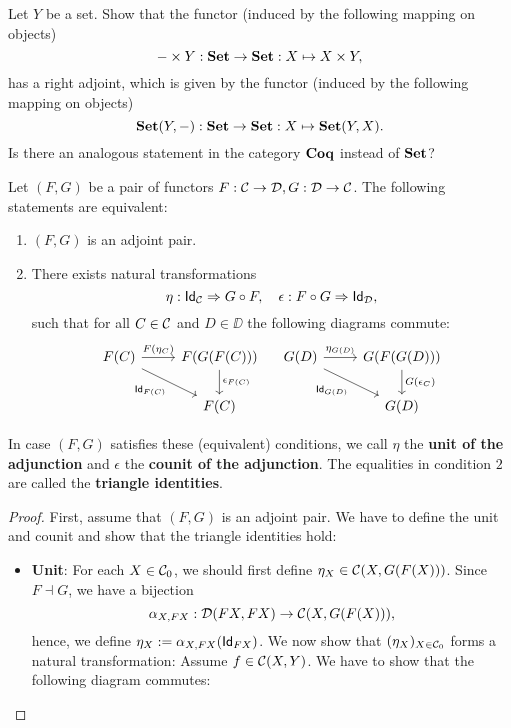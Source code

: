 \begin{exer}\label{exer:adjunction_homtensor_currying} Let $Y$ be a set. Show that the functor (induced by the following mapping on objects)
\[
- \times Y : \SET\to \SET: X\mapsto X\times Y,
\]
has a right adjoint, which is given by the functor (induced by the following mapping on objects)
\[
\CHom{\SET}{Y}{-} : \SET\to\SET : X\mapsto \CHom{\SET}{Y}{X}.
\]
Is there an analogous statement in the category $\COQ$ instead of $\SET$?
\end{exer}

\begin{thm} Let $(F,G)$ be a pair of functors $F : \CC\to\DD, G: \DD\to\CC$. The following statements are equivalent:
\begin{enumerate}
\item $(F,G)$ is an adjoint pair.
\item There exists natural transformations 
\[
\NatTrans{\eta}{\Id[\CC]}{\co{F}{G}}, \quad \NatTrans{\epsilon}{\co{G}{F}}{\Id[\DD]},
\]
such that for all $C\in\CC$ and $D\in\DD$ the following diagrams commute:
\[
\begin{tikzcd}
F(C) \arrow[r,"{F(\eta_C)}"] \arrow[rd,swap, "{\Id[F(C)]}"] & F(G(F(C))) \arrow[d, "{\epsilon_{F(C)}}"] \\
& F(C)
\end{tikzcd} \quad 
\begin{tikzcd}
G(D) \arrow[r,"{\eta_{G(D)}}"] \arrow[rd,swap, "{\Id[G(D)]}"] & G(F(G(D))) \arrow[d, "{G(\epsilon_{C})}"] \\
& G(D)
\end{tikzcd}
\]
\end{enumerate}
In case $(F,G)$ satisfies these (equivalent) conditions, we call $\eta$ the \textbf{unit of the adjunction} and $\epsilon$ the \textbf{counit of the adjunction}. The equalities in condition $2$ are called the \textbf{triangle identities}.
\begin{proof}
First, assume that $(F,G)$ is an adjoint pair. We have to define the unit and counit and show that the triangle identities hold:
\begin{itemize}
\item \textbf{Unit}: For each $X\in\Ob{\CC}$, we should first define $\eta_X \in \CHom{\CC}{X}{G(F(X))}$. Since $F \dashv G$, we have a bijection
\[
\alpha_{X,FX} : \CHom{\DD}{FX}{FX} \to \CHom{\CC}{X}{G(F(X))},
\]
hence, we define $\eta_X := \alpha_{X,FX}(\Id[FX])$. We now show that $(\eta_X)_{X\in\Ob{\CC}}$ forms a natural transformation: Assume $f\in\CHom{\CC}{X}{Y}$. We have to show that the following diagram commutes:

\end{itemize}
\end{proof}
\end{thm}
